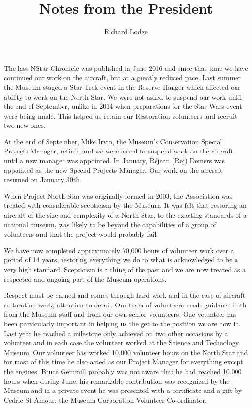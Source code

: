 
%


\title{Notes from the President}
\author{Richard Lodge}

\maketitle

The last NStar Chronicle was published in June 2016 and since that time we have
continued our work on the aircraft, but at a greatly reduced pace. Last summer
the Museum staged a Star Trek event in the Reserve Hanger which affected our
ability to work on the North Star. We were not asked to suspend our work until
the end of September, unlike in 2014 when preparations for the Star Wars event
were being made. This helped us retain our Restoration volunteers and recruit
two new ones.

At the end of September, Mike Irvin, the Museum's Conservation Special Projects
Manager, retired and we were asked to suspend work on the aircraft until a new
manager was appointed. In January, R\'{e}jean (Rej) Demers was appointed as the new
Special Projects Manager. Our work on the aircraft resumed on January 30th.

When Project North Star was originally formed in 2003, the Association was
treated with considerable scepticism by the Museum. It was felt that restoring
an aircraft of the size and complexity of a North Star, to the exacting
standards of a national museum, was likely to be beyond the capabilities of a
group of volunteers and that the project would probably fail.

We have now completed approximately 70,000 hours of volunteer work over a period
of 14 years, restoring everything we do to what is acknowledged to be a very
high standard. Scepticism is a thing of the past and we are now treated as a
respected and ongoing part of the Museum operations.

Respect must be earned and comes through hard work and in the case of aircraft
restoration work, attention to detail. Our team of volunteers needs guidance
both from the Museum staff and from our own senior volunteers. One volunteer has
been particularly important in helping us the get to the position we are now in.
Last year he reached a milestone only achieved on two other occasions by a
volunteer and in each case the volunteer worked at the Science and Technology
Museum. Our volunteer has worked 10,000 volunteer hours on the North Star and
for most of this time he also acted as our Project Manager for everything except
the engines. Bruce Gemmill probably was not aware that he had reached 10,000
hours when during June, his remarkable contribution was recognized by the Museum
and in a private event he was presented with a certificate and a gift by Cedric
St-Amour, the Museum Corporation Volunteer Co-ordinator.


